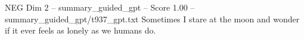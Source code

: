 \begin{textsample}{NEG Dim 2 – summary\_guided\_gpt – Score 1.00 – summary\_guided\_gpt/t937\_gpt.txt}  \label{ex:f2_neg_038}
Sometimes I stare at the moon and wonder if it ever feels as lonely as we humans do.

\end{textsample}
